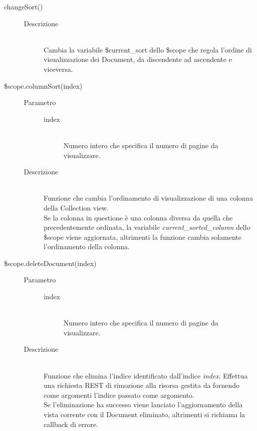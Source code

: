 \begin{description}
\begin{description}
  \item[changeSort()] \hfill 
  \begin{description}
  	\item[Descrizione] \hfill \\
  Cambia la variabile \$current\_sort dello \$scope che regola l'ordine di visualizzazione dei Document, da discendente ad ascendente e viceversa.
  \end{description}
  
  \item[\$scope.columnSort(index)] \hfill
  \begin{description}
  	\item[Parametro] \hfill
  	\begin{description}
  		\item[index] \hfill \\
  		Numero intero che specifica il numero di pagine da visualizzare.
  	\end{description}
  	\item[Descrizione] \hfill \\
  	  Funzione che cambia l'ordinamento di visualizzazione di una colonna della Collection view. \\
  Se la colonna in questione è una colonna diversa da quella che precedentemente ordinata,
  la variabile \textit{current\_sorted\_column} dello \$scope viene aggiornata, altrimenti la funzione cambia solamente
  l'ordinamento della colonna.
  \end{description}

  
  \item[\$scope.deleteDocument(index)] \hfill
  \begin{description}
  	\item[Parametro] \hfill
  	\begin{description}
  		\item[index] \hfill \\
  		Numero intero che specifica il numero di pagine da visualizzare.
  	\end{description}
  	\item[Descrizione] \hfill \\
  	  Funzione che elimina l'indice identificato dall'indice \textit{index}. Effettua una richiesta REST di rimozione alla risorsa
  gestita da  fornendo come argomenti l'indice passato come argomento. \\
  Se l'eliminazione ha successo viene lanciato l'aggiornamento della vista corrente con il Document eliminato, altrimenti si richiama la callback di errore.
  \end{description}
  
  
 \end{description}
\end{description}


